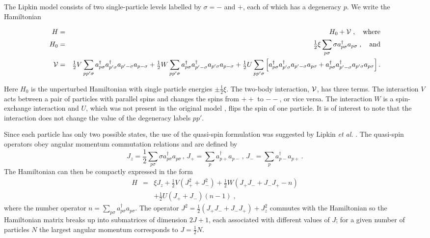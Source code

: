 \documentclass[prc,aps,amsmath,amssymb,preprintnumbers,showpacs,twocolumn]{revtex4}
\def\thalf{{\textstyle{\frac{1}{2}}}}
\newcommand{\bq}{\begin{eqnarray}}
\newcommand{\eq}{\end{eqnarray}}
\begin{document}
The Lipkin model \cite{LMG65} consists of two single-particle levels
labelled by $\sigma=-$ and $+$, each of which has a degeneracy $p$. We write
the Hamiltonian
\begin{widetext}
\vspace{-.7cm}
\bq
H&=& H_0+{\cal V}\;,\quad{\rm where}\nonumber\\
H_0&=&\thalf\xi\sum_{p\sigma}{\sigma}a_{p\sigma}^{\dagger}a_{p\sigma}\;,
\quad{\rm and}\nonumber\\
{\cal V}&=&\thalf V\sum_{pp'\sigma}a^{\dagger}_{p\sigma}
a^{\dagger}_{p'\sigma}a_{p'-\sigma}a_{p-\sigma}+
\thalf W\sum_{pp'\sigma}a^{\dagger}_{p\sigma}a_{p'-\sigma}^{\dagger}
a_{p'\sigma}a_{p-\sigma}
+\thalf U\sum_{pp'\sigma}\left[a^{\dagger}_{p\sigma}
a_{p'\sigma}^{\dagger}
a_{p'-\sigma}a_{p\sigma}+a^{\dagger}_{p\sigma}a_{p'-\sigma}^{\dagger}
a_{p'\sigma}a_{p\sigma}\right].
\eq
\end{widetext}
\vspace{-.2cm}
Here $H_0$ is the unperturbed  Hamiltonian with single particle energies
$\pm\thalf\xi$. The two-body interaction, ${\cal V}$, has three terms. The
interaction $V$ acts between a pair of particles with parallel spins and
changes the spins from $++$ to $--$, or vice versa. The interaction $W$
is a spin-exchange interaction and $U$, which was not present in the original
model \cite{LMG65}, flips the spin of one particle.
It is of interest to note that the interaction does not change the value of
the degeneracy labels $pp'$.

Since each particle has only two possible states, the use of the quasi-spin
formulation was suggested by Lipkin {\it et al.} \cite{LMG65}. The
quasi-spin operators obey angular momentum commutation relations and are
defined by
\begin{equation}
J_z=\thalf\sum_{p\sigma}\!{\sigma}a^{\dagger}_{p\sigma}a_{p\sigma}\,,\,
J_+=\sum_p\!a_{p+}^{\dagger}a_{p-}\,,\,J_-=\sum_p\!a_{p-}^{\dagger}a_{p+}\,.
\end{equation}
The Hamiltonian can then be compactly expressed in the form
\begin{eqnarray}
H&=&{\xi}J_z+\thalf V(J_+^2+J_-^2)+\thalf W(J_+J_-+J_-J_+-n)\nonumber\\
&&+\thalf U(J_++J_-)(n-1)\;,
\label{LIPH}
\end{eqnarray}
where the number operator $n=\sum_{p\sigma}a^{\dagger}_{p\sigma}
a_{p\sigma}$.
The operator $J^2=\frac{1}{2}(J_+J_-+J_-J_+)+J_z^2$ commutes with the
Hamiltonian so the Hamiltonian matrix breaks up into
submatrices of dimension $2J+1$, each associated with different values of
$J$; for a given number of particles $N$ the largest angular momentum
corresponds to $J=\thalf N$. 
\end{document}
